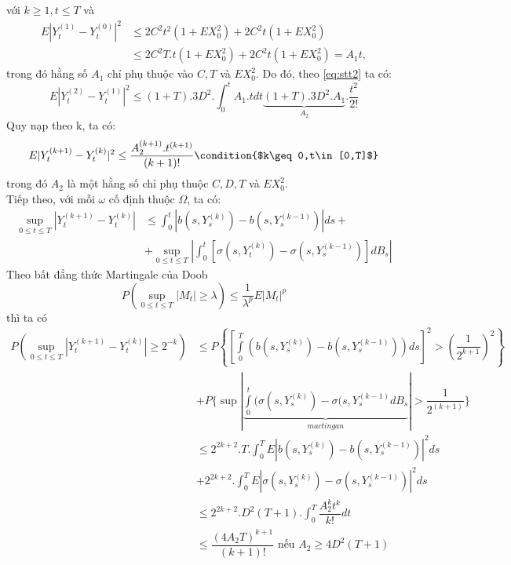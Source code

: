 \documentclass[a4paper]{article}
\numberwithin{equation}{section}
\begin{document}
với $k\geq 1,t\leq T$ và
\begin{equation*}
	\begin{split}
		E|Y^{(1)}_t-Y^{(0)}_t|^2&\leq 2C^2t^2(1+EX_0^2)+2C^2t(1+EX^2_0)\\
		&\leq 2C^2T.t(1+EX^2_0)+2C^2t(1+EX_0^2)=A_1t,
	\end{split}
\end{equation*}
trong đó hằng số $A_1$ chỉ phụ thuộc vào $C,T$ và $EX^2_0$. Do đó, theo \eqref{eq:stt2} ta có:
\begin{equation*}
	E|Y_t^{(2)}-Y_t^{(1)}|^2\leq(1+T).3D^2.\int_0^tA_1.tdt\underbrace{(1+T).3D^2.A_1}_{A_2}.\dfrac{t^2}{2!}
\end{equation*}
Quy nạp theo k, ta có:
\begin{equation}\label{eq:stt3}
	E|Y_t^{(k+1)}-Y_t^{(k)}|^2\leq\dfrac{A_2^{(k+1)}.t^{(k+1)}}{(k+1)!}\condition{$k\geq 0,t\in[0,T]$}
\end{equation}
trong đó $A_2$ là một hằng số chỉ phụ thuộc $C,D,T$ và $EX_0^2$.\\
Tiếp theo, với mỗi $\omega$ cố định thuộc $\Omega$, ta có:
\begin{equation*}
	\begin{split}
		\sup_{0\leq t\leq T}|Y_t^{(k+1)}-Y_t^{(k)}|&\leq\int_0^t|b(s,Y_s^{(k)})-b(s,Y_s^{(k-1)})|ds+\\
		&+\sup_{0\leq t\leq T}|\int_0^t[\sigma(s,Y_t^{(k)})-\sigma(s,Y_s^{(k-1)})]dB_s|
	\end{split}
\end{equation*}
Theo bất đẳng thức Martingale của Doob
\begin{equation*}
	P\left(\sup_{0\leq t\leq T}|M_t|\geq\lambda \right)\leq\dfrac{1}{\lambda^p}E|M_t|^p
\end{equation*}
thì ta có
\begin{equation*}
\begin{split}
P\left(\sup_{0\leq t\leq T}|Y_t^{(k+1)}-Y_t^{(k)}|\geq 2^{-k} \right)&\leq P\left\{\left[\int\limits_0^T(b(s,Y_s^{(k)})-b(s,Y_s^{(k-1)}))ds \right]^2>\left(\dfrac{1}{2^{k+1}}\right)^2 \right\}\\
&+P\{\sup{|\underbrace{\int\limits_0^t(\sigma(s,Y_s^{(k)})-\sigma(s,Y_s^{(k-1)}dB_s}_{mactingan}|}>\dfrac{1}{2^{(k+1)}} \}\\
&\leq	2^{2k+2}.T.\int_0^TE|b(s,Y_s^{(k)})-b(s,Y_s^{(k-1)})|^2ds\\
&+2^{2k+2}.\int_0^TE|\sigma(s,Y_s^{(k)})-\sigma(s,Y_s^{(k-1)})|^2ds\\
&\leq 2^{2k+2}.D^2(T+1).\int_0^T\dfrac{A_2^kt^k}{k!}dt\\
&\leq\dfrac{(4A_2T)^{k+1}}{(k+1)!}\text{ nếu }A_2\geq4D^2(T+1)
\end{split}
\end{equation*}
\end{document}

